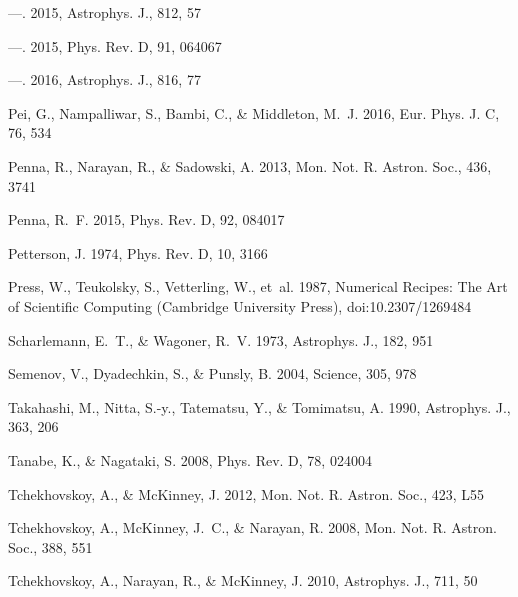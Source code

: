 \documentclass[iop,apj]{emulateapj}
\begin{document}
\begin{thebibliography}{}
---. 2015{}, Astrophys. J., 812, 57

---. 2015{}, Phys. Rev. D, 91, 064067

---. 2016, Astrophys. J., 816, 77

Pei, G., Nampalliwar, S., Bambi, C., \& Middleton, M.~J. 2016, Eur. Phys. J. C,
  76, 534

Penna, R., Narayan, R., \& Sadowski, A. 2013, Mon. Not. R. Astron. Soc., 436,
  3741

Penna, R.~F. 2015, Phys. Rev. D, 92, 084017

Petterson, J. 1974, Phys. Rev. D, 10, 3166

Press, W., Teukolsky, S., Vetterling, W., {et~al.} 1987, {Numerical Recipes:
  The Art of Scientific Computing} (Cambridge University Press),
  doi:10.2307/1269484

Scharlemann, E.~T., \& Wagoner, R.~V. 1973, Astrophys. J., 182, 951

Semenov, V., Dyadechkin, S., \& Punsly, B. 2004, Science, 305, 978

Takahashi, M., Nitta, S.-y., Tatematsu, Y., \& Tomimatsu, A. 1990, Astrophys.
  J., 363, 206

Tanabe, K., \& Nagataki, S. 2008, Phys. Rev. D, 78, 024004

Tchekhovskoy, A., \& McKinney, J. 2012, Mon. Not. R. Astron. Soc., 423, L55

Tchekhovskoy, A., McKinney, J.~C., \& Narayan, R. 2008, Mon. Not. R. Astron.
  Soc., 388, 551

Tchekhovskoy, A., Narayan, R., \& McKinney, J. 2010, Astrophys. J., 711, 50


\end{thebibliography}
\end{document}
